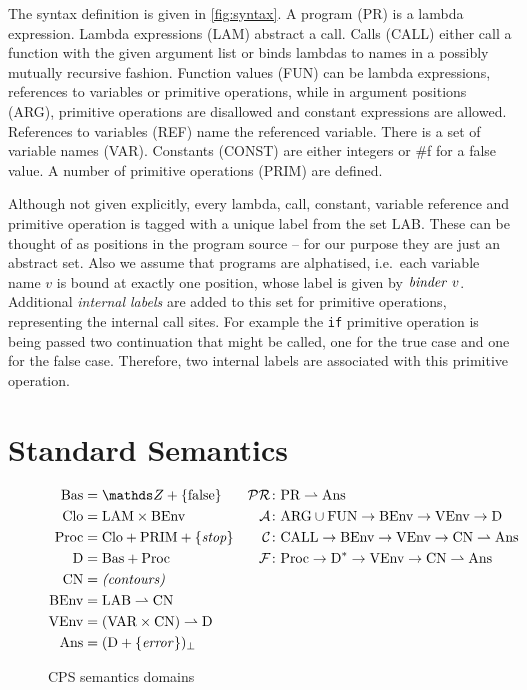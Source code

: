 \documentclass[a4paper,halfparskip,DIV=10,11pt]{scrbook}
\newcommand{\C}{\mathcal C}
\newcommand{\F}{\mathcal F}
\newcommand{\PR}{\mathcal {PR}}
\newcommand{\A}{\mathcal A}
\begin{document}
The syntax definition is given in \vref{fig:syntax}. A program (PR) is a lambda expression. Lambda expressions (LAM) abstract a call. Calls (CALL) either call a function with the given argument list or binds lambdas to names in a possibly mutually recursive fashion. Function values (FUN) can be lambda expressions, references to variables or primitive operations, while in argument positions (ARG), primitive operations are disallowed and constant expressions are allowed. References to variables (REF) name the referenced variable. There is a set of variable names (VAR). Constants (CONST) are either integers or \#f for a false value. A number of primitive operations (PRIM) are defined.

Although not given explicitly, every lambda, call, constant, variable reference and primitive operation is tagged with a unique label from the set LAB. These can be thought of as positions in the program source – for our purpose they are just an abstract set. Also we assume that programs are alphatised, i.e.\ each variable name $v$ is bound at exactly one position, whose label is given by $\text{\textit{binder}}\ v$. Additional \textit{internal labels} are added to this set for primitive operations, representing the internal call sites. For example the \texttt{if} primitive operation is being passed two continuation that might be called, one for the true case and one for the false case. Therefore, two internal labels are associated with this primitive operation.

\section{Standard Semantics}
\begin{figure}
\setlength{\FrameSep}{0pt}
\begin{framed}
\begin{align*}
\text{Bas} &= \mathds Z + \{\text{false}\} 
						& \PR &\colon \text{PR} \rightharpoonup \text{Ans} \\
\text{Clo} &= \text{LAM} \times \text{BEnv} 
						& \A &\colon \text{ARG}\cup\text{FUN} \to \text{BEnv} \to \text{VEnv} \to \text{D} \\
\text{Proc} &= \text{Clo} + \text{PRIM} + \{\text{\textit{stop}}\} 
						& \C &\colon \text{CALL}\to \text{BEnv} \to \text{VEnv} \to \text{CN} \rightharpoonup \text{Ans} \\
\text{D} &= \text{Bas} + \text{Proc}
						& \F &\colon \text{Proc}\to \text{D}^* \to \text{VEnv} \to \text{CN} \rightharpoonup \text{Ans} \\
\text{CN} &= \text{\textit{(contours)}} \\
\text{BEnv} &= \text{LAB} \rightharpoonup \text{CN} \\
\text{VEnv} &= (\text{VAR}\times\text{CN}) \rightharpoonup \text{D}\\
\text{Ans} &= (\text D + \{\text{\textit{error}}\})_\bot
\end{align*}
\end{framed}
\caption{CPS semantics domains}
\label{fig:semdoms}
\end{figure}
\end{document}
